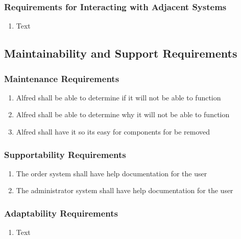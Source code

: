 \documentclass [11pt]{article}
\begin{document}
\subsubsection{Requirements for Interacting with Adjacent Systems}
	\begin{enumerate}[label=\textbf{(\roman*)}]
		\item Text
	\end{enumerate}

\subsection{Maintainability and Support Requirements }

\subsubsection{Maintenance Requirements }
	\begin{enumerate}[label=\textbf{(\roman*)}]
		\item Alfred shall be able to determine if it will not be able to function
		\item Alfred shall be able to determine why it will not be able to function
		\item Alfred shall have it so its easy for components for be removed
	\end{enumerate}

\subsubsection{Supportability Requirements }
	\begin{enumerate}[label=\textbf{(\roman*)}]
		\item The order system shall have help documentation for the user
		\item The administrator system shall have help documentation for the user
	\end{enumerate}

\subsubsection{Adaptability Requirements}
	\begin{enumerate}[label=\textbf{(\roman*)}]
		\item Text
	\end{enumerate}
\end{document}
